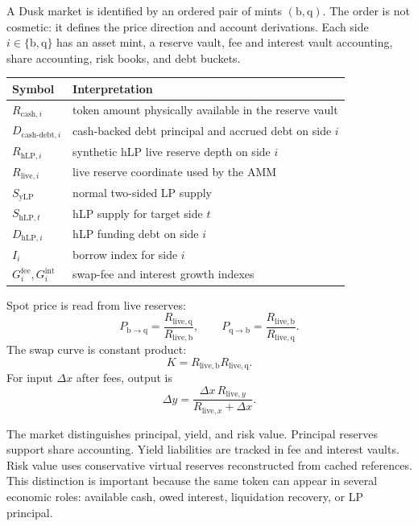\documentclass[11pt]{article}
\newcommand{\base}{\mathrm{b}}
\newcommand{\qasset}{\mathrm{q}}
\newcommand{\cash}{\mathrm{cash}}
\newcommand{\live}{\mathrm{live}}
\newcommand{\hlp}{\mathrm{hLP}}
\newcommand{\ylp}{\mathrm{yLP}}
\newcommand{\debt}{\mathrm{debt}}
\begin{document}
A Dusk market is identified by an ordered pair of mints $(\base,\qasset)$. The order is not cosmetic: it defines the price direction and account derivations. Each side $i\in\{\base,\qasset\}$ has an asset mint, a reserve vault, fee and interest vault accounting, share accounting, risk books, and debt buckets.

\begin{center}
\begin{tabular}{ll}
\toprule
Symbol & Interpretation \\
\midrule
$R_{\cash,i}$ & token amount physically available in the reserve vault \\
$D_{\cash\text{-}\debt,i}$ & cash-backed debt principal and accrued debt on side $i$ \\
$R_{\hlp,i}$ & synthetic hLP live reserve depth on side $i$ \\
$R_{\live,i}$ & live reserve coordinate used by the AMM \\
$S_{\ylp}$ & normal two-sided LP supply \\
$S_{\hlp,t}$ & hLP supply for target side $t$ \\
$D_{\hlp,i}$ & hLP funding debt on side $i$ \\
$I_i$ & borrow index for side $i$ \\
$G_i^{\mathrm{fee}},G_i^{\mathrm{int}}$ & swap-fee and interest growth indexes \\
\bottomrule
\end{tabular}
\end{center}

Spot price is read from live reserves:
\begin{equation}
P_{\base\to\qasset}=\frac{R_{\live,\qasset}}{R_{\live,\base}},\qquad
P_{\qasset\to\base}=\frac{R_{\live,\base}}{R_{\live,\qasset}}.
\end{equation}
The swap curve is constant product:
\begin{equation}
K=R_{\live,\base}R_{\live,\qasset}.
\end{equation}
For input $\Delta x$ after fees, output is
\begin{equation}
\Delta y=\frac{\Delta x\,R_{\live,y}}{R_{\live,x}+\Delta x}.
\label{eq:swapout}
\end{equation}

The market distinguishes principal, yield, and risk value. Principal reserves support share accounting. Yield liabilities are tracked in fee and interest vaults. Risk value uses conservative virtual reserves reconstructed from cached references. This distinction is important because the same token can appear in several economic roles: available cash, owed interest, liquidation recovery, or LP principal.
\end{document}
